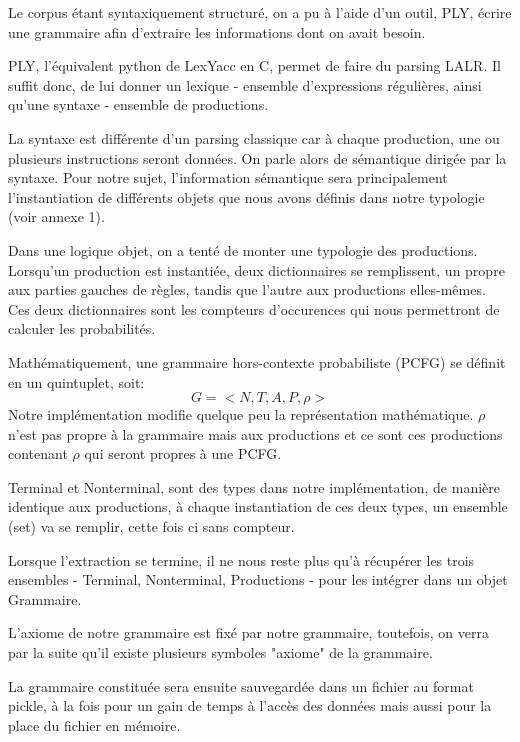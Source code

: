 \documentclass[a4paper,11pt]{article}
\begin{document}
Le corpus étant syntaxiquement structuré, on a pu à l'aide d'un outil, PLY, écrire une grammaire afin d'extraire les informations dont on avait besoin. 

PLY, l'équivalent python de LexYacc en C, permet de faire du parsing LALR. Il suffit donc, de lui donner un lexique - ensemble d'expressions régulières, 
ainsi qu'une syntaxe - ensemble de productions.

La syntaxe est différente d'un parsing classique car à chaque production, une ou plusieurs instructions seront données. On parle alors de sémantique dirigée par la syntaxe. 
Pour notre sujet, l'information sémantique sera principalement l'instantiation de différents objets que nous avons définis dans notre typologie (voir annexe 1).

Dans une logique objet, on a tenté de monter une typologie des productions. Lorsqu'un production est instantiée, deux dictionnaires se remplissent, un propre aux parties gauches 
de règles, tandis que l'autre aux productions elles-mêmes. Ces deux dictionnaires sont les compteurs d'occurences qui nous permettront de calculer les probabilités.

Mathématiquement, une grammaire hors-contexte probabiliste (PCFG) se définit en un quintuplet, soit: $$G = < N, T, A, P, \rho >$$Notre implémentation modifie quelque peu la représentation mathématique. 
$\rho$ n'est pas propre à la grammaire mais aux productions et ce sont ces productions contenant $\rho$ qui seront propres à une PCFG.

Terminal et Nonterminal, sont des types dans notre implémentation, de manière identique aux productions, à chaque instantiation de ces deux types, un ensemble (set) va se remplir, cette fois ci sans compteur.

Lorsque l'extraction se termine, il ne nous reste plus qu'à récupérer les trois ensembles - Terminal, Nonterminal, Productions - pour les intégrer dans un objet Grammaire.

L'axiome de notre grammaire est fixé par notre grammaire, toutefois, on verra par la suite qu'il existe plusieurs symboles "axiome" de la grammaire.

La grammaire constituée sera ensuite sauvegardée dans un fichier au format pickle, à la fois pour un gain de temps à l'accès des données mais aussi pour la place du fichier en mémoire.
\end{document}
